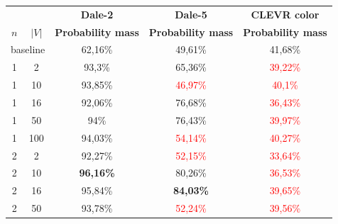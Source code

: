 \begin{table}[ht]
    \centering
    \begin{tabular}{cc|c|c|c}
        \toprule
                                      &           & \multicolumn{1}{c}{\textbf{Dale-2}} & \multicolumn{1}{c}{\textbf{Dale-5}} & \multicolumn{1}{c}{\textbf{CLEVR color}} \\  \cmidrule(lr){3-3}\cmidrule(lr){4-4}\cmidrule(lr){5-5}
        $n$                           & $|V|$     & \textbf{Probability mass}           & \textbf{Probability mass}           & \textbf{Probability mass}                \\\midrule
        \multicolumn{2}{c|}{baseline} & {62,16\%} & {49,61\%}                           & {41,68\%}                                                                      \\\midrule
        {1}                           & {2}       & {93,3\%}                            & {65,36\%}                           & \textcolor{red}{39,22\%}                 \\
        {1}                           & {10}      & {93,85\%}                           & \textcolor{red}{46,97\%}            & \textcolor{red}{40,1\%}                  \\
        {1}                           & {16}      & {92,06\%}                           & {76,68\%}                           & \textcolor{red}{36,43\%}                 \\
        {1}                           & {50}      & {94\%}                              & {76,43\%}                           & \textcolor{red}{39,97\%}                 \\
        {1}                           & {100}     & {94,03\%}                           & \textcolor{red}{54,14\%}            & \textcolor{red}{40,27\%}                 \\
        {2}                           & {2}       & {92,27\%}                           & \textcolor{red}{52,15\%}            & \textcolor{red}{33,64\%}                 \\
        {2}                           & {10}      & \textbf{96,16\%}                    & {80,26\%}                           & \textcolor{red}{36,53\%}                 \\
        {2}                           & {16}      & {95,84\%}                           & \textbf{84,03\%}                    & \textcolor{red}{39,65\%}                 \\
        {2}                           & {50}      & {93,78\%}                           & \textcolor{red}{52,24\%}            & \textcolor{red}{39,56\%}                 \\

\end{tabular}
\end{table}
